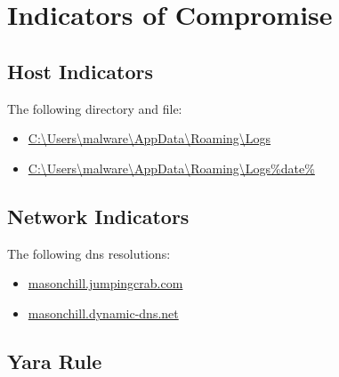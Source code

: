 \documentclass{article}
\begin{document}
    \section{Indicators of Compromise}
    \subsection{Host Indicators}
    The following directory and file:
    \begin{itemize}
        \item \url{C:\Users\malware\AppData\Roaming\Logs}
        \item \url{C:\Users\malware\AppData\Roaming\Logs\%date%}
    \end{itemize}
    \subsection{Network Indicators}
    The following dns resolutions:
    \begin{itemize}
        \item \url{masonchill.jumpingcrab.com}
        \item \url{masonchill.dynamic-dns.net}
    \end{itemize}
    \subsection{Yara Rule}
    \pagebreak
    \printbibliography
\end{document}
